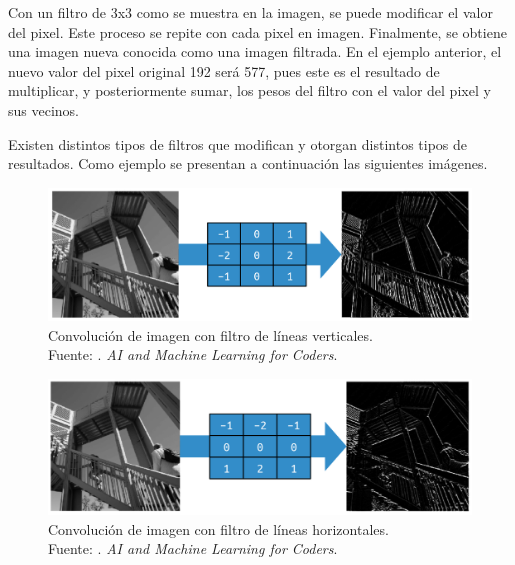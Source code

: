 Con un filtro de 3x3 como se muestra en la imagen, se puede modificar el valor del pixel. Este proceso se repite con cada pixel en imagen. Finalmente, se obtiene una imagen nueva conocida como una imagen filtrada. \parencite{bk_moroney2020aiandml} En el ejemplo anterior, el nuevo valor del pixel original 192 será 577, pues este es el resultado de multiplicar, y posteriormente sumar, los pesos del filtro con el valor del pixel y sus vecinos.

Existen distintos tipos de filtros que modifican y otorgan distintos tipos de resultados. Como ejemplo se presentan a continuación las siguientes imágenes.

\begin{figure}[H]
	\begin{center}
		\includegraphics[width=1.00\textwidth]{2/figures/cnn_filtro_vert.png}
		\caption[Convolución de imagen con filtro de líneas verticales]{Convolución de imagen con filtro de líneas verticales. \\
		Fuente: \cite{bk_moroney2020aiandml}. \textit{AI and Machine Learning for Coders}.}
		\label{2:fig202}
	\end{center}
\end{figure}

\begin{figure}[H]
	\begin{center}
		\includegraphics[width=1.00\textwidth]{2/figures/cnn_filtro_hori.png}
		\caption[Convolución de imagen con filtro de líneas horizontales]{Convolución de imagen con filtro de líneas horizontales. \\
		Fuente: \cite{bk_moroney2020aiandml}. \textit{AI and Machine Learning for Coders}.}
		\label{2:fig203}
	\end{center}
\end{figure}


